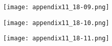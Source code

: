\begin{figure}[ht]
    \begin{center}
      \texttt{[image: appendix11\_18-09.png]}
    \end{center}
\end{figure}

\begin{figure}[ht]
    \begin{center}
      \texttt{[image: appendix11\_18-10.png]}
    \end{center}
\end{figure}

\begin{figure}[ht]
    \begin{center}
      \texttt{[image: appendix11\_18-11.png]}
    \end{center}
\end{figure}
